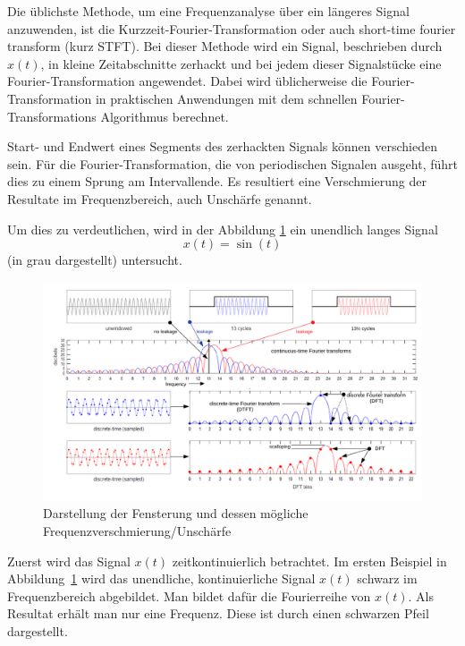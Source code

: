 
Die üblichste Methode, um eine Frequenzanalyse über ein längeres Signal anzuwenden, ist die  Kurzzeit-Fourier-Transformation oder auch short-time fourier transform (kurz STFT). Bei dieser Methode wird ein Signal, beschrieben durch $x(t)$, in kleine Zeitabschnitte zerhackt und bei jedem dieser Signalstücke eine Fourier-Transformation angewendet. Dabei wird üblicherweise die Fourier-Transformation in praktischen Anwendungen mit dem schnellen Fourier-Transformations Algorithmus berechnet.

Start- und Endwert eines Segments des zerhackten Signals können verschieden sein. Für die Fourier-Transformation, die von periodischen Signalen ausgeht, führt dies zu einem Sprung am Intervallende. Es resultiert eine Verschmierung der Resultate im Frequenzbereich, auch Unschärfe genannt. 

Um dies zu verdeutlichen, wird in der Abbildung \ref{fig:Spectral} ein unendlich langes Signal 
\[x(t)=\sin(t)\]
(in grau dargestellt) untersucht.

\begin{figure}
\centering
\includegraphics[width=\hsize]{papers/autotune/sections/fft/images/windows/Spectral.pdf}
\caption{Darstellung der Fensterung und dessen mögliche Frequenzverschmierung/Unschärfe \cite{wikipedia:Window}}
\label{fig:Spectral}
\end{figure}%

Zuerst wird das Signal $x(t)$ zeitkontinuierlich betrachtet. Im ersten Beispiel in Abbildung~\ref{fig:Spectral} wird das unendliche, kontinuierliche Signal $x(t)$ schwarz im Frequenzbereich abgebildet. Man bildet dafür die Fourierreihe von $x(t)$. Als Resultat erhält man nur eine Frequenz. Diese ist durch einen schwarzen Pfeil dargestellt.

